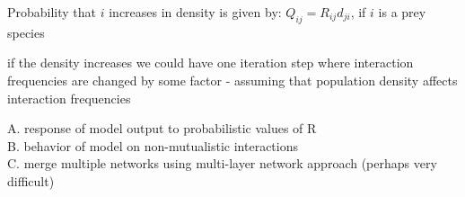 \documentclass[12pt]{article}
\begin{document}
Probability that $i$ increases in density is given by:
$Q_{ij} = R_{ij} d_{ji}$, if $i$ is a prey species 

if the density increases we could have one iteration step where interaction frequencies are changed by some factor - assuming that population density affects interaction frequencies



A. response of model output to probabilistic values of R\\
B. behavior of model on non-mutualistic interactions\\
C. merge multiple networks using multi-layer network approach (perhaps very difficult)



\end{document}
